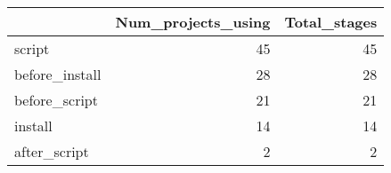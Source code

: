 \begin{tabular}{lrr}
\toprule
{} &  Num\_projects\_using &  Total\_stages \\
\midrule
script         &                  45 &            45 \\
before\_install &                  28 &            28 \\
before\_script  &                  21 &            21 \\
install        &                  14 &            14 \\
after\_script   &                   2 &             2 \\
\bottomrule
\end{tabular}
